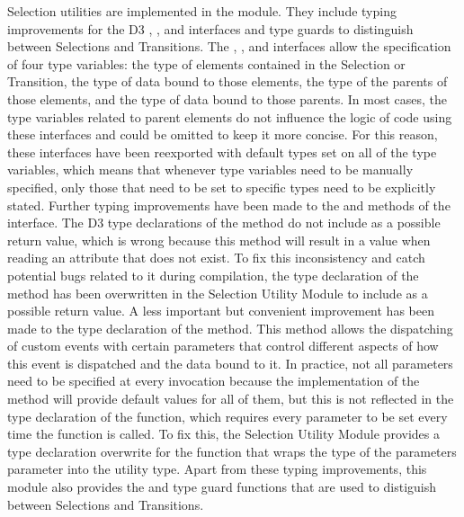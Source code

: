 Selection utilities are implemented in the  module.
They include typing improvements for the D3 , , and  interfaces and type guards to distinguish between Selections and Transitions.
The , , and  interfaces allow the specification of four type variables: the type of elements contained in the Selection or Transition, the type of data bound to those elements, the type of the parents of those elements, and the type of data bound to those parents.
In most cases, the type variables related to parent elements do not influence the logic of code using these interfaces and could be omitted to keep it more concise.
For this reason, these interfaces have been reexported with default types set on all of the type variables, which means that whenever type variables need to be manually specified, only those that need to be set to specific types need to be explicitly stated.
Further typing improvements have been made to the  and  methods of the  interface.
The D3 type declarations of the  method do not include  as a possible return value, which is wrong because this method will result in a  value when reading an attribute that does not exist.
To fix this inconsistency and catch potential bugs related to it during compilation, the type declaration of the  method has been overwritten in the Selection Utility Module to include  as a possible return value.
A less important but convenient improvement has been made to the type declaration of the  method.
This method allows the dispatching of custom events with certain parameters that control different aspects of how this event is dispatched and the data bound to it.
In practice, not all parameters need to be specified at every invocation because the implementation of the  method will provide default values for all of them, but this is not reflected in the type declaration of the function, which requires every parameter to be set every time the function is called.
To fix this, the Selection Utility Module provides a type declaration overwrite for the  function that wraps the type of the parameters parameter into the  utility type.
Apart from these typing improvements, this module also provides the  and  type guard functions that are used to distiguish between Selections and Transitions.


